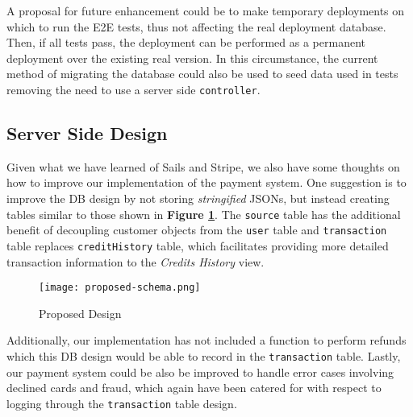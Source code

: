 A proposal for future enhancement could be to make temporary deployments on which to run the E2E tests, thus not affecting the real deployment database. Then, if all tests pass, the deployment can be performed as a permanent deployment over the existing real version. In this circumstance, the current method of migrating the database could also be used to seed data used in tests removing the need to use a server side \texttt{controller}.

\subsection{Server Side Design}
\label{subsec:server-side-design}

Given what we have learned of Sails and Stripe, we also have some thoughts on how to improve our implementation of the payment system. One suggestion is to improve the DB design by not storing \textit{stringified} JSONs, but instead creating tables similar to those shown in \textbf{Figure \ref{fig:proposed-schema}}. The \texttt{source} table has the additional benefit of decoupling customer objects from the \texttt{user} table and \texttt{transaction} table replaces \texttt{creditHistory} table, which facilitates providing more detailed transaction information to the \textit{Credits History} view.\\

\begin{figure}[!hbt]
  	\centering
 	\texttt{[image: proposed-schema.png]}
  	\caption{Proposed Design}
 	\label{fig:proposed-schema}
\end{figure}

Additionally, our implementation has not included a function to perform refunds which this DB design would be able to record in the \texttt{transaction} table. Lastly, our payment system could be also be improved to handle error cases involving declined cards and fraud, which again have been catered for with respect to logging through the \texttt{transaction} table design.
